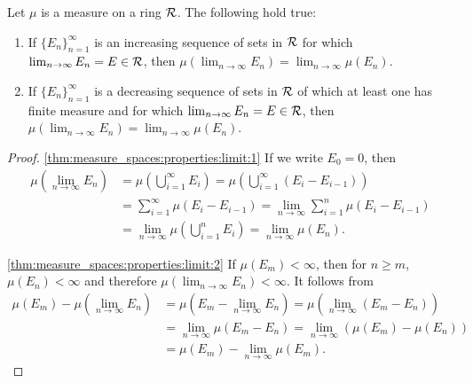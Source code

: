\begin{thm}
\label{thm:measure_spaces:properties:limit}
Let $\mu$ is a measure on a ring $\mathcal{R}$. 
The following hold true: 
\begin{enumerate}
    \item \label{thm:measure_spaces:properties:limit:1}
    If $\{E_n\}_{n=1}^\infty$ is an increasing sequence of sets in 
    $\mathcal{R}$ for which $\lim_{n \to \infty} E_n = E \in \mathcal{R}$, then $\mu\left( 
    \lim_{n \to \infty} E_n \right) = \lim_{n \to \infty} \mu(E_n)$. 
    \item \label{thm:measure_spaces:properties:limit:2}
    If $\{E_n\}_{n=1}^\infty$ is a decreasing sequence of sets in 
    $\mathcal{R}$ of which at least one has finite measure and for which 
    $\lim_{n \to \infty} E_n = E \in \mathcal{R}$, then $\mu\left( 
    \lim_{n \to \infty} E_n \right) = \lim_{n \to \infty} \mu(E_n)$. 
\end{enumerate}
\end{thm}

\begin{proof}
\ref{thm:measure_spaces:properties:limit:1}
If we write $E_0 = 0$, then 
\begin{equation*}
    \begin{aligned}
        \mu(\lim_{n \to \infty}E_n) 
        &= \mu\left( \bigcup_{i=1}^\infty E_i \right) 
        = \mu\left( \bigcup_{i=1}^\infty (E_i - E_{i - 1}) \right) \\ 
        &= \sum_{i=1}^\infty \mu\left( E_i - E_{i - 1} \right) 
        = \lim_{n \to \infty} \sum_{i=1}^n \mu\left( E_i - E_{i - 1} \right) \\ 
        &= \lim_{n \to \infty} \mu\left( \bigcup_{i=1}^n E_i \right) 
        = \lim_{n \to \infty} \mu(E_n). 
    \end{aligned}
\end{equation*}

\ref{thm:measure_spaces:properties:limit:2}
If $\mu(E_m) < \infty$, then for $n \ge m$, $\mu(E_n) < \infty$ and 
therefore $\mu\left( \lim_{n \to \infty} E_n \right) < \infty$. 
It follows from 
\begin{equation*}
    \begin{aligned}
        \mu(E_m) - \mu(\lim_{n \to \infty} E_n) 
        &= \mu\left( E_m - \lim_{n \to \infty} E_n \right) 
        = \mu\left(\lim_{n \to \infty} (E_m - E_n) \right) \\
        &= \lim_{n \to \infty} \mu(E_m - E_n) 
        = \lim_{n \to \infty}\left( \mu(E_m) - \mu(E_n) \right) \\
        &= \mu(E_m) - \lim_{n \to \infty} \mu(E_m).
    \end{aligned}
\end{equation*}
\end{proof}


